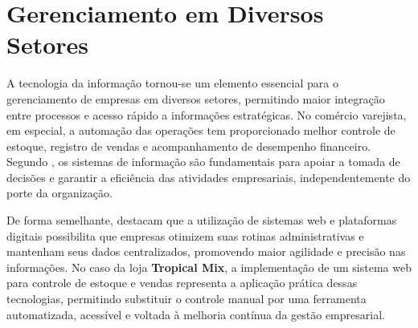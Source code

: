\section{Gerenciamento em Diversos Setores}

A tecnologia da informação tornou-se um elemento essencial para o gerenciamento de empresas em diversos setores, permitindo maior integração entre processos e acesso rápido a informações estratégicas. No comércio varejista, em especial, a automação das operações tem proporcionado melhor controle de estoque, registro de vendas e acompanhamento de desempenho financeiro. Segundo \cite{obrien2013}, os sistemas de informação são fundamentais para apoiar a tomada de decisões e garantir a eficiência das atividades empresariais, independentemente do porte da organização.

De forma semelhante, \cite{laudon2022} destacam que a utilização de sistemas web e plataformas digitais possibilita que empresas otimizem suas rotinas administrativas e mantenham seus dados centralizados, promovendo maior agilidade e precisão nas informações. No caso da loja \textbf{Tropical Mix}, a implementação de um sistema web para controle de estoque e vendas representa a aplicação prática dessas tecnologias, permitindo substituir o controle manual por uma ferramenta automatizada, acessível e voltada à melhoria contínua da gestão empresarial.


